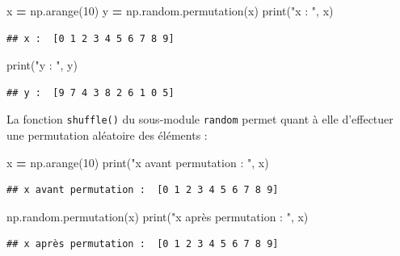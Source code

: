 \documentclass[12pt,]{book}
\newenvironment{Shaded}{\begin{snugshade}}{\end{snugshade}}
\newcommand{\DecValTok}[1]{\textcolor[rgb]{0.00,0.00,0.81}{#1}}
\newcommand{\StringTok}[1]{\textcolor[rgb]{0.31,0.60,0.02}{#1}}
\newcommand{\OperatorTok}[1]{\textcolor[rgb]{0.81,0.36,0.00}{\textbf{#1}}}
\newcommand{\BuiltInTok}[1]{#1}
\newcommand{\NormalTok}[1]{#1}
\numberwithin{equation}{section}
\numberwithin{countremarque}{section}
\begin{document}
\begin{Shaded}
\begin{Highlighting}[]
\NormalTok{x }\OperatorTok{=}\NormalTok{ np.arange(}\DecValTok{10}\NormalTok{)}
\NormalTok{y }\OperatorTok{=}\NormalTok{ np.random.permutation(x)}
\BuiltInTok{print}\NormalTok{(}\StringTok{"x : "}\NormalTok{, x)}
\end{Highlighting}
\end{Shaded}

\begin{lstlisting}
## x :  [0 1 2 3 4 5 6 7 8 9]
\end{lstlisting}

\begin{Shaded}
\begin{Highlighting}[]
\BuiltInTok{print}\NormalTok{(}\StringTok{"y : "}\NormalTok{, y)}
\end{Highlighting}
\end{Shaded}

\begin{lstlisting}
## y :  [9 7 4 3 8 2 6 1 0 5]
\end{lstlisting}

La fonction \texttt{shuffle()} du sous-module \texttt{random} permet
quant à elle d'effectuer une permutation aléatoire des éléments :

\begin{Shaded}
\begin{Highlighting}[]
\NormalTok{x }\OperatorTok{=}\NormalTok{ np.arange(}\DecValTok{10}\NormalTok{)}
\BuiltInTok{print}\NormalTok{(}\StringTok{"x avant permutation : "}\NormalTok{, x)}
\end{Highlighting}
\end{Shaded}

\begin{lstlisting}
## x avant permutation :  [0 1 2 3 4 5 6 7 8 9]
\end{lstlisting}

\begin{Shaded}
\begin{Highlighting}[]
\NormalTok{np.random.permutation(x)}
\BuiltInTok{print}\NormalTok{(}\StringTok{"x après permutation : "}\NormalTok{, x)}
\end{Highlighting}
\end{Shaded}

\begin{lstlisting}
## x après permutation :  [0 1 2 3 4 5 6 7 8 9]
\end{lstlisting}
\end{document}
